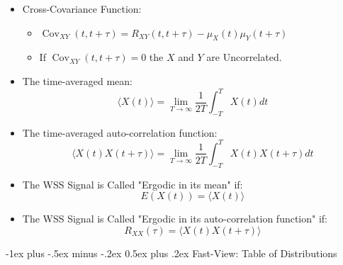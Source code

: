 \documentclass[10pt,landscape]{article}
\makeatletter
\renewcommand{\section}{\@startsection{section}{1}{0mm}%
                                {-1ex plus -.5ex minus -.2ex}%
                                {0.5ex plus .2ex}%
                                {\normalfont\large\bfseries}}
\makeatother
\begin{document}
\begin{multicols*}{3}
\begin{itemize}
\item Cross-Covariance Function:

\begin{itemize}
    \item $
\operatorname{Cov}_{X Y}(t, t+\tau)=R_{X Y}(t, t+\tau)-\mu_X(t) \mu_Y(t+\tau)
$
\item If $\operatorname{Cov}_{X Y}(t, t+\tau)=0$ the $X$ and $Y$ are Uncorrelated.
\end{itemize}

\item The time-averaged mean:
$$
\langle X(t)\rangle=\lim _{T \rightarrow \infty} \frac{1}{2 T} \int_{-T}^T X(t) dt
$$

\item The time-averaged auto-correlation function:
$$
\langle X(t) X(t+\tau)\rangle=\lim _{T \rightarrow \infty} \frac{1}{2 T} \int_{-T}^T X(t) X(t+\tau) dt
$$

\item The WSS Signal is Called "Ergodic in its mean" if:
$$
E(X(t))=\langle X(t)\rangle
$$

\item  The WSS Signal is Called "Ergodic in its auto-correlation function" if:
$$
R_{X X}(\tau)=\langle X(t) X(t+\tau)\rangle
$$ 
\end{itemize}

\end{multicols*}

\section{Fast-View: Table of Distributions} 
\end{document}
